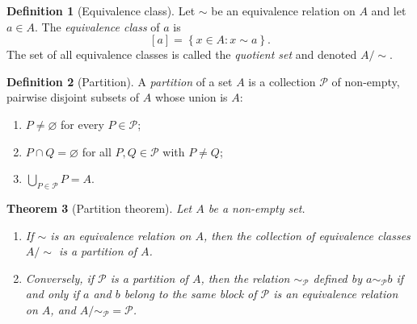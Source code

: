\documentclass[12pt,a4paper,openany]{book}
\theoremstyle{definition}
\newtheorem{definition}{Definition}[chapter]
\theoremstyle{plain}
\newtheorem{theorem}[definition]{Theorem}
\theoremstyle{remark}
\newcommand{\set}[1]{\left\{#1\right\}}
\begin{document}
\begin{definition}[Equivalence class]\label{def:equiv-class}
Let $\sim$ be an equivalence relation on $A$ and let $a \in A$. The
\emph{equivalence class} of $a$ is
\[
  [a] = \set{x \in A : x \sim a}.
\]
The set of all equivalence classes is called the \emph{quotient set} and
denoted $A / {\sim}$.
\end{definition}

\begin{definition}[Partition]\label{def:partition}
A \emph{partition} of a set $A$ is a collection $\mathcal{P}$ of non-empty,
pairwise disjoint subsets of $A$ whose union is $A$:
\begin{enumerate}[label=(\roman*)]
  \item $P \neq \varnothing$ for every $P \in \mathcal{P}$;
  \item $P \cap Q = \varnothing$ for all $P, Q \in \mathcal{P}$ with $P \neq Q$;
  \item $\bigcup_{P \in \mathcal{P}} P = A$.
\end{enumerate}
\end{definition}

\begin{theorem}[Partition theorem]\label{thm:partition}
Let $A$ be a non-empty set.
\begin{enumerate}[label=(\alph*)]
  \item If $\sim$ is an equivalence relation on $A$, then the collection of
        equivalence classes $A / {\sim}$ is a partition of $A$.
  \item Conversely, if $\mathcal{P}$ is a partition of $A$, then the relation
        $\sim_{\mathcal{P}}$ defined by $a \sim_{\mathcal{P}} b$ if and only
        if $a$ and $b$ belong to the same block of $\mathcal{P}$ is an
        equivalence relation on $A$, and $A / {\sim_{\mathcal{P}}} = \mathcal{P}$.
\end{enumerate}
\end{theorem}
\end{document}
